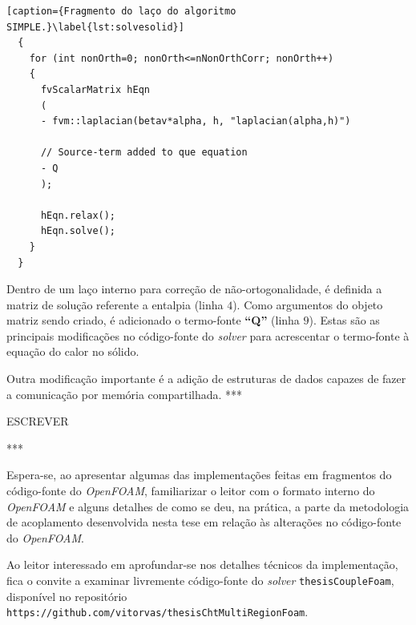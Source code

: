 \begin{lstlisting}[caption={Fragmento do laço do algoritmo SIMPLE.}\label{lst:solvesolid}]
  {
    for (int nonOrth=0; nonOrth<=nNonOrthCorr; nonOrth++)
    {
      fvScalarMatrix hEqn
      (
      - fvm::laplacian(betav*alpha, h, "laplacian(alpha,h)")

      // Source-term added to que equation
      - Q
      );

      hEqn.relax();
      hEqn.solve();
    }
  }
\end{lstlisting}

Dentro de um laço interno para correção de não-ortogonalidade, é definida a matriz de solução
referente a entalpia (linha $4$). Como argumentos do objeto matriz sendo criado, é adicionado
o termo-fonte \textbf{``Q''} (linha $9$). Estas são as principais
modificações no código-fonte do \textit{solver} para
acrescentar o termo-fonte à equação do calor no sólido.

Outra modificação importante é a adição de estruturas de dados capazes de fazer a comunicação
por memória compartilhada.
***

ESCREVER

***



Espera-se, ao apresentar algumas das implementações feitas em fragmentos do código-fonte
do \textit{OpenFOAM}, familiarizar o leitor com o formato interno do \textit{OpenFOAM}
e alguns detalhes de como se deu, na prática, a parte da metodologia de acoplamento
desenvolvida nesta tese em relação às alterações no código-fonte do \textit{OpenFOAM}.

Ao leitor interessado em aprofundar-se nos detalhes técnicos da implementação, fica o
convite a examinar livremente código-fonte do \textit{solver} \texttt{thesisCoupleFoam}, disponível
no repositório \texttt{https://github.com/vitorvas/thesisChtMultiRegionFoam}.




































